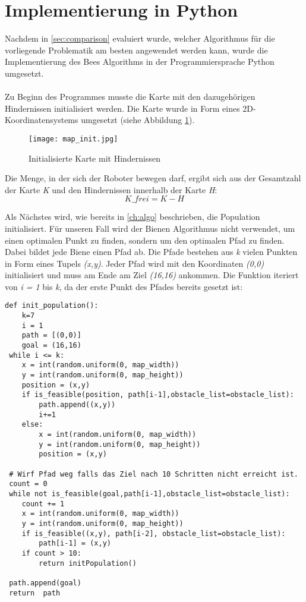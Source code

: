 \section{Implementierung in Python}
Nachdem in \autoref{sec:comparison} evaluiert wurde, welcher Algorithmus für die vorliegende Problematik am besten angewendet werden kann, wurde die Implementierung des \glqq Bees Algorithms\grqq{} in der Programmiersprache Python umgesetzt.\\\\
Zu Beginn des Programmes musste die Karte mit den dazugehörigen Hindernissen initialisiert werden. Die Karte wurde in Form eines 2D-Koordinatensystems umgesetzt (siehe Abbildung \ref{fig:map_init}).

\begin{figure}[h]
    \centering
    \texttt{[image: map\_init.jpg]}
    \caption{Initialisierte Karte mit Hindernissen\\}   
    \label{fig:map_init}
\end{figure}

Die Menge, in der sich der Roboter bewegen darf, ergibt sich aus der Gesamtzahl der Karte \emph{K} und den Hindernissen innerhalb der Karte \emph{H}:
\[K\_frei = K - H\]

Als Nächstes wird, wie bereits in \autoref{ch:algo} beschrieben, die Population initialisiert. Für unseren Fall wird der Bienen Algorithmus nicht verwendet, um einen optimalen Punkt zu finden, sondern um den optimalen Pfad zu finden. Dabei bildet jede Biene einen Pfad ab. Die Pfade bestehen aus \emph{k} vielen Punkten in Form eines Tupels \emph{(x,y)}. Jeder Pfad wird mit den Koordinaten \emph{(0,0)} initialisiert und muss am Ende am Ziel \emph{(16,16)} ankommen. Die Funktion iteriert von \emph{i = 1} bis \emph{k}, da der erste Punkt des Pfades bereits gesetzt ist:

\begin{verbatim}
def init_population():
    k=7
    i = 1
    path = [(0,0)]
    goal = (16,16)
 while i <= k:
    x = int(random.uniform(0, map_width))
    y = int(random.uniform(0, map_height))
    position = (x,y)
    if is_feasible(position, path[i-1],obstacle_list=obstacle_list):
        path.append((x,y))
        i+=1
    else: 
        x = int(random.uniform(0, map_width))
        y = int(random.uniform(0, map_height))
        position = (x,y)
            
 # Wirf Pfad weg falls das Ziel nach 10 Schritten nicht erreicht ist.
 count = 0
 while not is_feasible(goal,path[i-1],obstacle_list=obstacle_list):
    count += 1
    x = int(random.uniform(0, map_width))
    y = int(random.uniform(0, map_height))
    if is_feasible((x,y), path[i-2], obstacle_list=obstacle_list):
        path[i-1] = (x,y)
    if count > 10:
        return initPopulation()   
    
 path.append(goal)
 return  path
\end{verbatim}
\vspace*{-3mm}
\vspace*{3mm}

